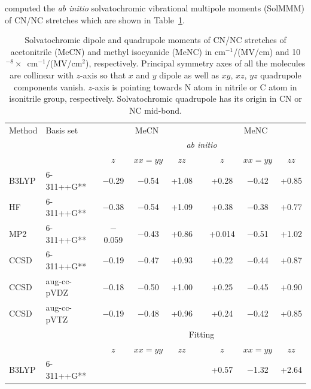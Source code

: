 \documentclass[a4paper,titlepage,twoside,fleqn,12pt]{book}
\begin{document}
\begin{refsection}
computed the \emph{ab initio} solvatochromic vibrational multipole moments (SolMMM) 
of CN/NC stretches which are shown in Table~\ref{t:cnnc-solcamm}.
%
\begin{table}[t!]
\caption{Solvatochromic dipole and quadrupole moments of CN/NC stretches of
acetonitrile (MeCN) and methyl isocyanide (MeNC) in cm$^{-1}$/(MV/cm) and 10$^{-8}\times$\
cm$^{-1}$/(MV/cm$^2$), respectively. Principal symmetry axes of all the molecules are collinear with 
$z$-axis so that $x$ and $y$ dipole as well as $xy$, $xz$, $yz$ quadrupole components vanish. 
$z$-axis is 
pointing towards N atom in nitrile or C atom in isonitrile group, respectively. Solvatochromic 
quadrupole has its origin in CN or NC mid\hyp{}bond.
\label{t:cnnc-solcamm}}
\begin{tabular*}{1.0\textwidth}{@{\extracolsep{\fill} } ll ccc c ccc}
\hline\hline
Method & Basis set    & \multicolumn{3}{c}{MeCN} && \multicolumn{3}{c}{MeNC}                 \\
       &              & \multicolumn{7}{c}{\emph{ab initio}}                                 \\
       &              & $z$     &  $xx=yy$  & $zz$     &&    $z$    &  $xx=yy$    &    $zz$  \\
\cline{3-5} \cline{7-9}
B3LYP  & 6-311++G**   & $-$0.29  &  $-$0.54   &  +1.08   &&   +0.28   &   $-$0.42    &   +0.85  \\
HF     & 6-311++G**   & $-$0.38  &  $-$0.54   &  +1.09   &&   +0.38   &   $-$0.38    &   +0.77  \\
MP2    & 6-311++G**   & $-$0.059 &  $-$0.43   &  +0.86   &&   +0.014  &   $-$0.51    &   +1.02  \\
CCSD   & 6-311++G**   & $-$0.19  &  $-$0.47   &  +0.93   &&   +0.22   &   $-$0.44    &   +0.87  \\
CCSD   & aug-cc-pVDZ  & $-$0.18  &  $-$0.50   &  +1.00   &&   +0.25   &   $-$0.45    &   +0.90  \\
CCSD   & aug-cc-pVTZ  & $-$0.19  &  $-$0.48   &  +0.96   &&   +0.24   &   $-$0.42    &   +0.85  \\
       &              & \multicolumn{7}{c}{Fitting}                                             \\
       &              & $z$      &  $xx=yy$   & $zz$     &&    $z$    &  $xx=yy$     &    $zz$  \\
\cline{3-5} \cline{7-9}
B3LYP  & 6-311++G** 
                      &          &            &          &&   +0.57   &   $-$1.32    &   +2.64  \\

\end{tabular*}
\end{table}
\end{refsection}
\end{document}

